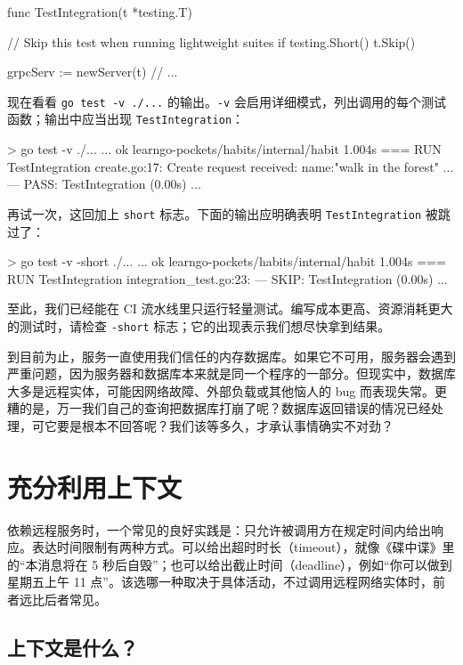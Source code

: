 \begin{gocode}[]
func TestIntegration(t *testing.T) {
    // Skip this test when running lightweight suites
    if testing.Short() {
        t.Skip()
    }

    grpcServ := newServer(t)
    // ...
}
\end{gocode}

现在看看 \texttt{go test -v ./...} 的输出。\texttt{-v} 会启用详细模式，列出调用的每个测试函数；输出中应当出现 \texttt{TestIntegration}：

\begin{shellcode}[]
> go test -v ./...
...
ok      learngo-pockets/habits/internal/habit    1.004s
=== RUN   TestIntegration
    create.go:17: Create request received: name:"walk in the forest"
...
--- PASS: TestIntegration (0.00s)
...
\end{shellcode}

再试一次，这回加上 \texttt{short} 标志。下面的输出应明确表明 \texttt{TestIntegration} 被跳过了：

\begin{shellcode}[]
> go test -v -short ./...
...
ok      learngo-pockets/habits/internal/habit    1.004s
=== RUN   TestIntegration
    integration_test.go:23:
--- SKIP: TestIntegration (0.00s)
...
\end{shellcode}

至此，我们已经能在 CI 流水线里只运行轻量测试。编写成本更高、资源消耗更大的测试时，请检查 \texttt{-short} 标志；它的出现表示我们想尽快拿到结果。

到目前为止，服务一直使用我们信任的内存数据库。如果它不可用，服务器会遇到严重问题，因为服务器和数据库本来就是同一个程序的一部分。但现实中，数据库大多是远程实体，可能因网络故障、外部负载或其他恼人的 bug 而表现失常。更糟的是，万一我们自己的查询把数据库打崩了呢？数据库返回错误的情况已经处理，可它要是根本不回答呢？我们该等多久，才承认事情确实不对劲？

\section{充分利用上下文}

依赖远程服务时，一个常见的良好实践是：只允许被调用方在规定时间内给出响应。表达时间限制有两种方式。可以给出超时时长（timeout），就像《碟中谍》里的“本消息将在 5 秒后自毁”；也可以给出截止时间（deadline），例如“你可以做到星期五上午 11 点”。该选哪一种取决于具体活动，不过调用远程网络实体时，前者远比后者常见。

\subsection{上下文是什么？}

